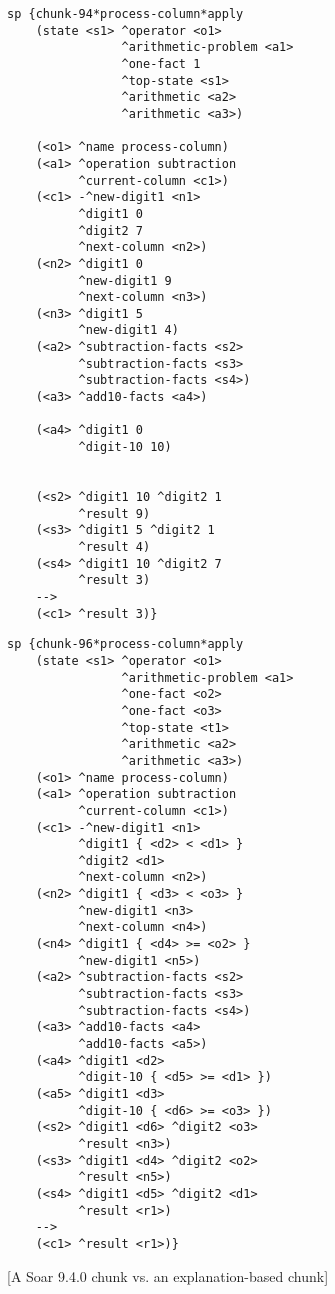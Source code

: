 \begin{figure}
	{\footnotesize
	\begin{multicols}{2}
        	\begin{verbatim}
sp {chunk-94*process-column*apply
    (state <s1> ^operator <o1>
                ^arithmetic-problem <a1>
                ^one-fact 1
                ^top-state <s1>
                ^arithmetic <a2>
                ^arithmetic <a3>)

    (<o1> ^name process-column)
    (<a1> ^operation subtraction
          ^current-column <c1>)
    (<c1> -^new-digit1 <n1>
          ^digit1 0
          ^digit2 7
          ^next-column <n2>)
    (<n2> ^digit1 0
          ^new-digit1 9
          ^next-column <n3>)
    (<n3> ^digit1 5
          ^new-digit1 4)
    (<a2> ^subtraction-facts <s2>
          ^subtraction-facts <s3>
          ^subtraction-facts <s4>)
    (<a3> ^add10-facts <a4>)

    (<a4> ^digit1 0
          ^digit-10 10)


    (<s2> ^digit1 10 ^digit2 1
          ^result 9)
    (<s3> ^digit1 5 ^digit2 1
          ^result 4)
    (<s4> ^digit1 10 ^digit2 7
          ^result 3)
    -->
    (<c1> ^result 3)}
        	\end{verbatim}
        	\columnbreak
        	\begin{verbatim}
sp {chunk-96*process-column*apply
    (state <s1> ^operator <o1>
                ^arithmetic-problem <a1>
                ^one-fact <o2>
                ^one-fact <o3>
                ^top-state <t1>
                ^arithmetic <a2>
                ^arithmetic <a3>)
    (<o1> ^name process-column)
    (<a1> ^operation subtraction
          ^current-column <c1>)
    (<c1> -^new-digit1 <n1>
          ^digit1 { <d2> < <d1> }
          ^digit2 <d1>
          ^next-column <n2>)
    (<n2> ^digit1 { <d3> < <o3> }
          ^new-digit1 <n3>
          ^next-column <n4>)
    (<n4> ^digit1 { <d4> >= <o2> }
          ^new-digit1 <n5>)
    (<a2> ^subtraction-facts <s2>
          ^subtraction-facts <s3>
          ^subtraction-facts <s4>)
    (<a3> ^add10-facts <a4>
          ^add10-facts <a5>)
    (<a4> ^digit1 <d2>
          ^digit-10 { <d5> >= <d1> })
    (<a5> ^digit1 <d3>
          ^digit-10 { <d6> >= <o3> })
    (<s2> ^digit1 <d6> ^digit2 <o3>
          ^result <n3>)
    (<s3> ^digit1 <d4> ^digit2 <o2>
          ^result <n5>)
    (<s4> ^digit1 <d5> ^digit2 <d1>
          ^result <r1>)
    -->
    (<c1> ^result <r1>)}
        	\end{verbatim}
	\end{multicols}
	}
	[A Soar 9.4.0 chunk vs. an explanation-based chunk]
	\label{chunk-comparison}
\end{figure}

